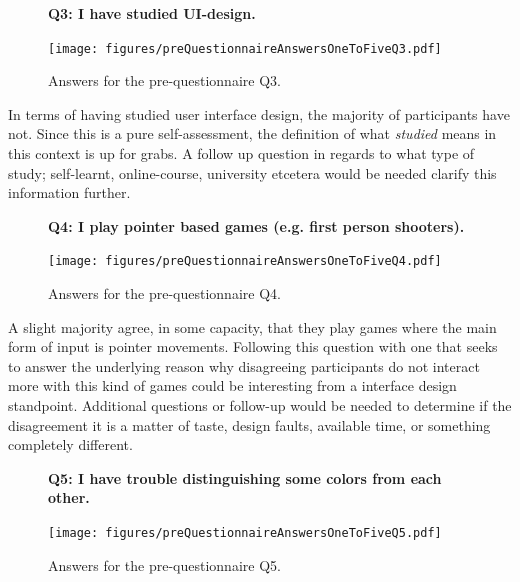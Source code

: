\documentclass[nofilelist,dvipsnames]{cslthse-msc}
\begin{document}
				\begin{figure}[h!]
          \textbf{Q3: I have studied UI-design.}
          \begin{center}
            \texttt{[image: figures/preQuestionnaireAnswersOneToFiveQ3.pdf]}
            \vspace{-1cm}
            \caption{Answers for the pre-questionnaire Q3.}
          \end{center}
				\end{figure}

        In terms of having studied user interface design, the majority of
        participants have not. Since this is a pure self-assessment, the
        definition of what \textit{studied} means in this context is up for
        grabs. A follow up question in regards to what type of study;
        self-learnt, online-course, university etcetera would be needed clarify
        this information further.

				\begin{figure}[h!]
          \textbf{Q4: I play pointer based games (e.g. first person shooters).}
          \begin{center}
            \texttt{[image: figures/preQuestionnaireAnswersOneToFiveQ4.pdf]}
            \vspace{-1cm}
            \caption{Answers for the pre-questionnaire Q4.}
          \end{center}
				\end{figure}

        A slight majority agree, in some capacity, that they play games where
        the main form of input is pointer movements. Following this question
        with one that seeks to answer the underlying reason why disagreeing
        participants do not interact more with this kind of games could be
        interesting from a interface design standpoint. Additional questions or
        follow-up would be needed to determine if the disagreement it is a
        matter of taste, design faults, available time, or something completely
        different.

        \newpage
				\begin{figure}[h!]
          \textbf{Q5: I have trouble distinguishing some colors from each other.}
          \begin{center}
            \texttt{[image: figures/preQuestionnaireAnswersOneToFiveQ5.pdf]}
            \vspace{-1cm}
            \caption{Answers for the pre-questionnaire Q5.}
            \vspace{-0.4cm}
          \end{center}
				\end{figure}
\end{document}
